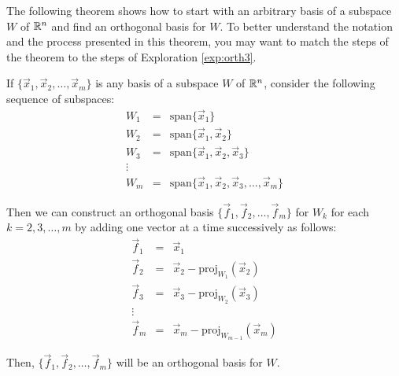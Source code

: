 \documentclass{ximera}
\begin{document}

The following theorem shows how to start with an arbitrary basis of a subspace $W$ of $\mathbb{R}^n$ and find an orthogonal basis for $W$.  To better understand the notation and the process presented in this theorem, you may want to match the steps of the theorem to the steps of Exploration \ref{exp:orth3}.

\begin{theorem} \label{th:GS}
If $\{\vec{x}_{1}, \vec{x}_{2}, \dots , \vec{x}_{m}\}$ is any basis of a subspace $W$ of $\mathbb{R}^n$, consider the following sequence of subspaces:
\begin{equation*}
\begin{array}{ccl}
W_1&=&\mbox{span}\{\vec{x}_{1}\} \\
W_2&=&\mbox{span}\{\vec{x}_{1},\vec{x}_{2}\} \\
W_3&=&\mbox{span}\{\vec{x}_{1},\vec{x}_{2},\vec{x}_{3}\} \\
\vdots &&\\
W_m &=& \mbox{span}\{\vec{x}_{1},\vec{x}_{2},\vec{x}_{3},\ldots,\vec{x}_{m}\}
\end{array}
\end{equation*}

Then we can construct an orthogonal basis $\{\vec{f}_{1},\vec{f}_{2},\ldots,\vec{f}_{m}\}$ for $W_k$ for each $k = 2, 3, \dots , m$ by adding one vector at a time successively as follows:
\begin{equation*}
\begin{array}{ccl}
\vec{f}_{1} &=& \vec{x}_{1} \\
\vec{f}_{2} &=& \vec{x}_{2} - \mbox{proj}_{W_1}(\vec{x}_2) \\
\vec{f}_{3} &=& \vec{x}_{3} - \mbox{proj}_{W_2}(\vec{x}_3) \\
\vdots &&\\
\vec{f}_{m} &=& \vec{x}_{m} - \mbox{proj}_{W_{m-1}}(\vec{x}_m)
\end{array}
\end{equation*}

Then, $\{\vec{f}_{1},\vec{f}_{2},\ldots,\vec{f}_{m}\}$ will be an orthogonal basis for $W$.  %


\end{theorem}
\end{document}

